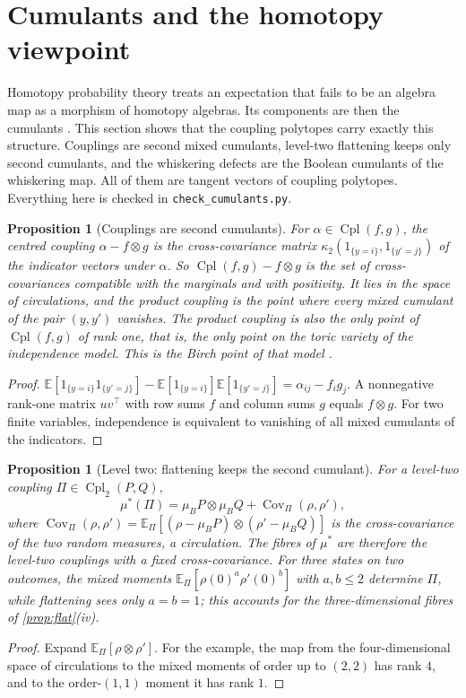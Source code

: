 \documentclass[11pt]{article}
\newtheorem{proposition}[theorem]{Proposition}
\theoremstyle{definition}
\theoremstyle{remark}
\newcommand{\Cpl}{\operatorname{Cpl}}
\begin{document}
\section{Cumulants and the homotopy viewpoint}\label{sec:cumulants}

Homotopy probability theory treats an expectation that fails to be an algebra map as a morphism of
homotopy algebras. Its components are then the cumulants \cite{HPT1,HPT2}. This section shows that the
coupling polytopes carry exactly this structure. Couplings are second mixed cumulants, level-two
flattening keeps only second cumulants, and the whiskering defects are the Boolean cumulants of the
whiskering map. All of them are tangent vectors of coupling polytopes. Everything here is checked in
\texttt{check\_cumulants.py}.

\begin{proposition}[Couplings are second cumulants]\label{prop:kappa2}
For $\alpha\in\Cpl(f,g)$, the centred coupling $\alpha-f\otimes g$ is the cross-covariance matrix
$\kappa_2(1_{\{y=i\}},1_{\{y'=j\}})$ of the indicator vectors under $\alpha$. So $\Cpl(f,g)-f\otimes g$ is the set
of cross-covariances compatible with the marginals and with positivity. It lies in the space of
circulations, and the product coupling is the point where every mixed cumulant of the pair $(y,y')$
vanishes. The product coupling is also the only point of $\Cpl(f,g)$ of rank one, that is, the only point
on the toric variety of the independence model. This is the Birch point of that model
\cite{PachterSturmfels2005}.
\end{proposition}
\begin{proof}
$\mathbb{E}[1_{\{y=i\}}1_{\{y'=j\}}]-\mathbb{E}[1_{\{y=i\}}]\mathbb{E}[1_{\{y'=j\}}]=\alpha_{ij}-f_ig_j$. A nonnegative rank-one matrix
$uv^\top$ with row sums $f$ and column sums $g$ equals $f\otimes g$. For two finite variables, independence is
equivalent to vanishing of all mixed cumulants of the indicators.
\end{proof}

\begin{proposition}[Level two: flattening keeps the second cumulant]\label{prop:flatcov}
For a level-two coupling $\Pi\in\Cpl_2(P,Q)$,
\[
\mu^*(\Pi)=\mu_BP\otimes\mu_BQ+\operatorname{Cov}_\Pi(\rho,\rho'),
\]
where $\operatorname{Cov}_\Pi(\rho,\rho')=\mathbb{E}_\Pi[(\rho-\mu_BP)\otimes(\rho'-\mu_BQ)]$ is the cross-covariance of the
two random measures, a circulation. The fibres of $\mu^*$ are therefore the level-two couplings with a
fixed cross-covariance. For three states on two outcomes, the mixed moments
$\mathbb{E}_\Pi[\rho(0)^a\rho'(0)^b]$ with $a,b\le2$ determine $\Pi$, while flattening sees only $a=b=1$; this accounts
for the three-dimensional fibres of \cref{prop:flat}(iv).
\end{proposition}
\begin{proof}
Expand $\mathbb{E}_\Pi[\rho\otimes\rho']$. For the example, the map from the four-dimensional space of circulations to the
mixed moments of order up to $(2,2)$ has rank $4$, and to the order-$(1,1)$ moment it has rank $1$.
\end{proof}
\end{document}
